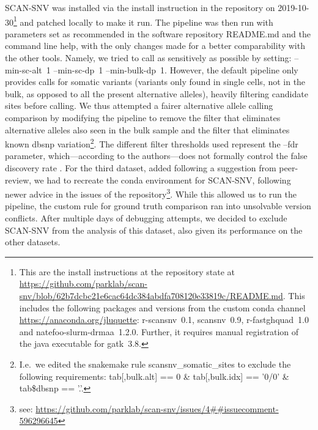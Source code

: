 \documentclass[authoryear,preprint,11pt]{scrartcl}
\begin{document}
SCAN-SNV \citep{luquette_identification_2019} was installed via the install instruction in the repository on 2019-10-30\footnote{
 This are the install instructions at the repository state at \url{https://github.com/parklab/scan-snv/blob/62b7dcbc21e6cac64dc384abdfa708120e33819c/README.md}.
 This includes the following packages and versions from the custom conda channel \url{https://anaconda.org/jluquette}:
 {\ttfamily r-scansnv~0.1}, {\ttfamily scansnv~0.9}, {\ttfamily r-fastghquad~1.0} and {\ttfamily natefoo-slurm-drmaa~1.2.0}.
 Further, it requires manual registration of the java executable for {\ttfamily gatk~3.8}.
} and patched locally to make it run.
The pipeline was then run with parameters set as recommended in the software repository {\ttfamily README.md} and the command line help, with the only changes made for a better comparability with the other tools.
Namely, we tried to call as sensitively as possible by setting: {\ttfamily  --min-sc-alt~1 --min-sc-dp~1 --min-bulk-dp~1}.
However, the default pipeline only provides calls for somatic variants (variants only found in single cells, not in the bulk, as opposed to all the present alternative alleles), heavily filtering candidate sites before calling.
We thus attempted a fairer alternative allele calling comparison by modifying the pipeline to remove the filter that eliminates alternative alleles also seen in the bulk sample and the filter that eliminates known dbsnp variation\footnote{
 I.e.~we edited the snakemake {\ttfamily rule scansnv\_somatic\_sites} to exclude the following requirements:
 {\ttfamily tab[,bulk.alt] == 0 \& tab[,bulk.idx] == '0/0' \& tab\$dbsnp == '.'}.
}.
The different filter thresholds used represent the {\ttfamily --fdr} parameter, which---according to the authors---does not formally control the false discovery rate \citep{luquette_identification_2019}.
For the third dataset, added following a suggestion from peer-review, we had to recreate the conda environment for SCAN-SNV, following newer advice in the issues of the repository\footnote{see: \url{https://github.com/parklab/scan-snv/issues/4##issuecomment-596296645}}.
While this allowed us to run the pipeline, the custom rule for ground truth comparison ran into unsolvable version conflicts.
After multiple days of debugging attempts, we decided to exclude SCAN-SNV from the analysis of this dataset, also given its performance on the other datasets.\\
\end{document}
